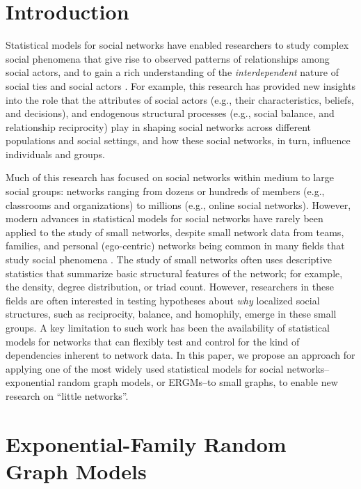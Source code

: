 \documentclass[review, nonatbib,doubleblind]{elsarticle/elsarticle}
\begin{document}
\section{Introduction}

Statistical models for social networks have enabled researchers to study complex social phenomena that give rise to observed patterns of relationships among social actors, and to gain a rich understanding of the \textit{interdependent} nature of social ties and social actors \cite{Snijders2011,lusher2012exponential}. For example, this research has provided new insights into the role that the attributes of social actors (e.g., their characteristics, beliefs, and decisions), and endogenous structural processes (e.g., social balance, and relationship reciprocity) play in shaping social networks across different populations and social settings, and how  these social networks, in turn, influence individuals and groups. 

Much of this research has focused on social networks within medium to large social groups: networks ranging from dozens or hundreds of members (e.g., classrooms and organizations) to millions (e.g., online social networks). However, modern advances in statistical models for social networks have rarely been applied to the study of small networks, despite small network data from teams, families, and personal (ego-centric) networks being common in many fields that study social phenomena \cite{HENTTONEN201074, CarterDR2015, bott2001family,crossley2015social}. The study of small networks often uses descriptive statistics that summarize basic structural features of the network; for example, the density, degree distribution, or triad count. However, researchers in these fields are often interested in testing hypotheses about \textit{why} localized social structures, such as reciprocity, balance, and homophily, emerge in these small groups. A key limitation to such work has been the availability of statistical models for networks that can flexibly test and control for the kind of dependencies inherent to network data. In this paper, we propose an approach for applying one of the most widely used statistical models for social networks--exponential random graph models, or ERGMs--to small graphs, to enable new research on ``little networks''. 

\section{Exponential-Family Random Graph Models}
\end{document}
